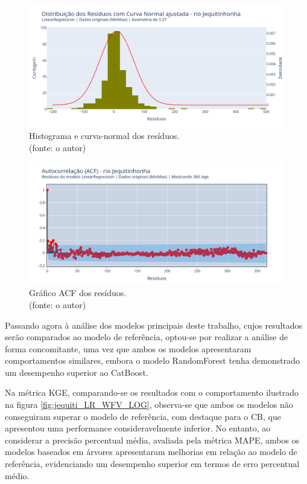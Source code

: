 \begin{figure}[!h]
\centering
\includegraphics[scale=0.33]{Figuras/jequiti/wfv/LR/LR_WFV_ORIG_RESID_x_CURVA_NORMAL.png}
\caption{Histograma e curva-normal dos resíduos.\\(fonte: o autor)}
\label{fig:jequiti_LR_WFV_ORIG_RESID_x_CURVA_NORMAL}
\end{figure}

\begin{figure}[!h]
\centering
\includegraphics[scale=0.33]{Figuras/jequiti/wfv/LR/LR_WFV_ORIG_RESID_ACF.png}
\caption{Gráfico ACF dos resíduos.\\(fonte: o autor)}
\label{fig:jequiti_LR_WFV_ORIG_RESID_ACF}
\end{figure}
\clearpage

Passando agora à análise dos modelos principais deste trabalho, cujos resultados serão comparados ao modelo de referência, optou-se por realizar a análise de forma concomitante, uma vez que ambos os modelos apresentaram comportamentos similares, embora o modelo RandomForest tenha demonstrado um desempenho superior ao CatBoost.

Na métrica KGE, comparando-se os resultados com o comportamento ilustrado na figura \ref{fig:jequiti_LR_WFV_LOG}, observa-se que ambos os modelos não conseguiram superar o modelo de referência, com destaque para o CB, que apresentou uma performance consideravelmente inferior. No entanto, ao considerar a precisão percentual média, avaliada pela métrica MAPE, ambos os modelos baseados em árvores apresentaram melhorias em relação ao modelo de referência, evidenciando um desempenho superior em termos de erro percentual médio.


